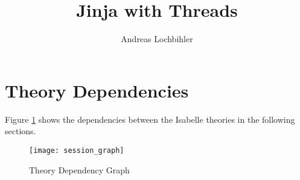 \documentclass[11pt,a4paper]{book}
\begin{document}
\title{Jinja with Threads}
\author{Andreas Lochbihler}
\maketitle


\tableofcontents

\section{Theory Dependencies}

Figure \ref{theory-deps} shows the dependencies between 
the Isabelle theories in the following sections.

\begin{figure}[h!t]
\begin{center}
  \texttt{[image: session\_graph]}
\end{center}
\caption{Theory Dependency Graph\label{theory-deps}}
\end{figure}

\newpage

\end{document}

